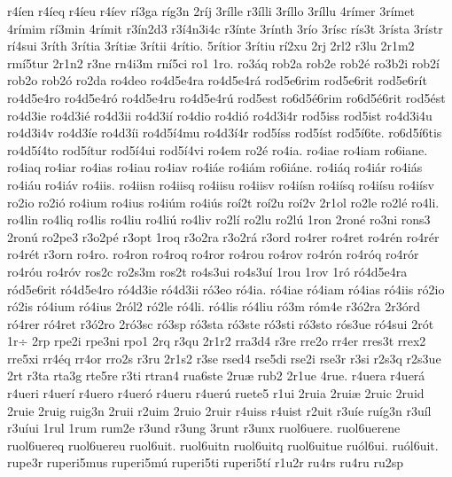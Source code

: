 {r4^^eden
r4^^edeq
r4^^edeu
r4^^edev
r^^ed3ga
r^^edg3n
2r^^edj
3r^^edlle
r3^^edlli
3r^^edllo
3r^^edllu
4r^^edmer
3r^^edmet
4r^^edmim
r^^ed3min
4r^^edmit
r3^^edn2d3
r3^^ed4n3i4c
r3^^ednte
3r^^ednth
3r^^edo
3r^^edsc
r^^eds3t
3r^^edsta
3r^^edstr
r^^ed4sui
3r^^edth
3r^^edtia
3r^^edti^^e6
3r^^edtii
4r^^edtio.
5r^^edtior
3r^^edtiu
r^^ed2xu
2rj
2rl2
r3lu
2r1m2
rm^^ed5tur
2r1n2
r3ne
rn4i3m
rn^^ed5ci
ro1
1ro.
ro3^^e1q
rob2a
rob2e
rob2^^e9
ro3b2i
rob2^^ed
rob2o
rob2^^f3
ro2da
ro4deo
ro4d5e4ra
ro4d5e4r^^e1
rod5e6rim
rod5e6rit
rod5e6r^^edt
ro4d5e4ro
ro4d5e4r^^f3
ro4d5e4ru
ro4d5e4r^^fa
rod5est
ro6d5^^e96rim
ro6d5^^e96rit
rod5^^e9st
ro4d3ie
ro4d3i^^e9
ro4d3ii
ro4d3i^^ed
ro4dio
ro4di^^f3
ro4d3i4r
rod5iss
rod5ist
ro4d3i4u
ro4d3i4v
ro4d3^^ede
ro4d3^^edi
ro4d5^^ed4mu
ro4d3^^ed4r
rod5^^edss
rod5^^edst
rod5^^ed6te.
ro6d5^^ed6tis
ro4d5^^ed4to
rod5^^edtur
rod5^^ed4ui
rod5^^ed4vi
ro4em
ro2^^e9
ro4ia.
ro4iae
ro4iam
ro6iane.
ro4iaq
ro4iar
ro4ias
ro4iau
ro4iav
ro4i^^e1e
ro4i^^e1m
ro6i^^e1ne.
ro4i^^e1q
ro4i^^e1r
ro4i^^e1s
ro4i^^e1u
ro4i^^e1v
ro4iis.
ro4iisn
ro4iisq
ro4iisu
ro4iisv
ro4i^^edsn
ro4i^^edsq
ro4i^^edsu
ro4i^^edsv
ro2io
ro2i^^f3
ro4ium
ro4ius
ro4i^^fam
ro4i^^fas
ro^^ed2t
ro^^ed2u
ro^^ed2v
2r1ol
ro2le
ro2l^^e9
ro4li.
ro4lin
ro4liq
ro4lis
ro4liu
ro4li^^fa
ro4liv
ro2l^^ed
ro2lu
ro2l^^fa
1ron
2ron^^e9
ro3ni
rons3
2ron^^fa
ro2pe3
r3o2p^^e9
r3opt
1roq
r3o2ra
r3o2r^^e1
r3ord
ro4rer
ro4ret
ro4r^^e9n
ro4r^^e9r
ro4r^^e9t
r3orn
ro4ro.
ro4ron
ro4roq
ro4ror
ro4rou
ro4rov
ro4r^^f3n
ro4r^^f3q
ro4r^^f3r
ro4r^^f3u
ro4r^^f3v
ros2c
ro2s3m
ros2t
ro4s3ui
ro4s3u^^ed
1rou
1rov
1r^^f3
r^^f34d5e4ra
r^^f3d5e6rit
r^^f34d5e4ro
r^^f34d3ie
r^^f34d3ii
r^^f33eo
r^^f34ia.
r^^f34iae
r^^f34iam
r^^f34ias
r^^f34iis
r^^f32io
r^^f32is
r^^f34ium
r^^f34ius
2r^^f3l2
r^^f32le
r^^f34li.
r^^f34lis
r^^f34liu
r^^f33m
r^^f3m4e
r3^^f32ra
2r3^^f3rd
r^^f34rer
r^^f34ret
r3^^f32ro
2r^^f33sc
r^^f33sp
r^^f33sta
r^^f33ste
r^^f33sti
r^^f33sto
r^^f3s3ue
r^^f34sui
2r^^f3t
1r^^f7
2rp
rpe2i
rpe3ni
rpo1
2rq
r3qu
2r1r2
rra3d4
r3re
rre2o
rr4er
rres3t
rrex2
rre5xi
rr4^^e9q
rr4or
rro2s
r3ru
2r1s2
r3se
rsed4
rse5di
rse2i
rse3r
r3si
r2s3q
r2s3ue
2rt
r3ta
rta3g
rte5re
r3ti
rtran4
rua6ste
2ru^^e6
rub2
2r1ue
4rue.
r4uera
r4uer^^e1
r4ueri
r4uer^^ed
r4uero
r4uer^^f3
r4ueru
r4uer^^fa
ruete5
r1ui
2ruia
2rui^^e6
2ruic
2ruid
2ruie
2ruig
ruig3n
2ruii
r2uim
2ruio
2ruir
r4uiss
r4uist
r2uit
r3u^^ede
ru^^edg3n
r3u^^edl
r3u^^edui
1rul
1rum
rum2e
r3und
r3ung
3runt
r3unx
ruol6uere.
ruol6uerene
ruol6uereq
ruol6uereu
ruol6uit.
ruol6uitn
ruol6uitq
ruol6uitue
ru^^f3l6ui.
ru^^f3l6uit.
rupe3r
ruperi5mus
ruperi5m^^fa
ruperi5ti
ruperi5t^^ed
r1u2r
ru4rs
ru4ru
ru2sp
}
